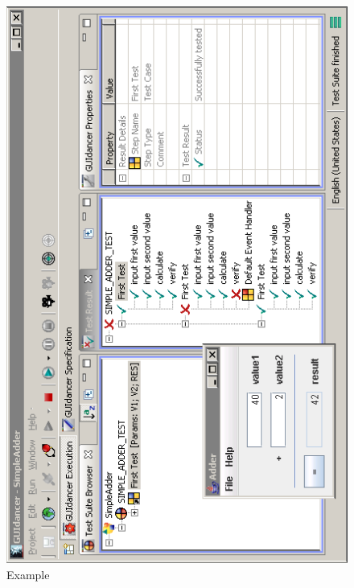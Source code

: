 \begin{enumerate}
\begin{figure}[h]
\includegraphics{GettingStarted/PS/Execution}
\caption{Example \gdsuite{}}
\label{Testshot}
\end{figure}



 \end{enumerate}
